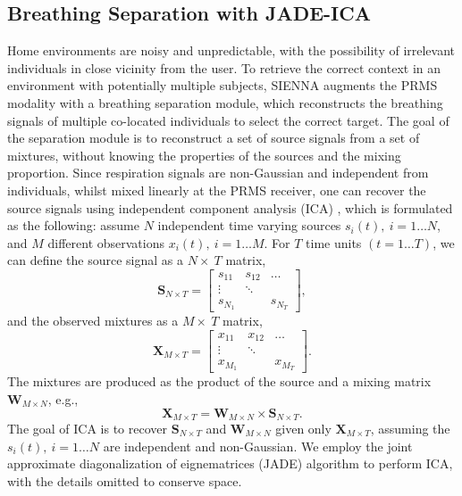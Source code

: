 \subsection{Breathing Separation with JADE-ICA}
\label{section:breathing separation}
Home environments are noisy and unpredictable, with the possibility of irrelevant individuals in close vicinity from the user. To retrieve the correct context in an environment with potentially multiple subjects, SIENNA augments the PRMS modality with a breathing separation module, which reconstructs the breathing signals of multiple co-located individuals to select the correct target. 
The goal of the separation module is to reconstruct a set of source signals from a set of mixtures, without knowing the properties of the sources and the mixing proportion. 
Since respiration signals are non-Gaussian and independent from individuals, whilst mixed linearly at the PRMS receiver, one can recover the source signals using independent component analysis (ICA) \cite{yue_extracting_2018}, which is formulated as the following: assume $N$ independent time varying sources $ s_i(t),\ i=1 \ldots N$, and $M$ different observations
$ x_i(t),\ i=1 \ldots M$. For $T$ time units $(t=1 \ldots T)$, we can define the source signal as a $N \times\ T$ matrix,
\[
\mathbf{S}_{N \times T} = \begin{bmatrix} 
    s_{11} & s_{12} & \dots \\
    \vdots & \ddots & \\
    s_{N_1} &        & s_{N_T} 
    \end{bmatrix},
\]
and the observed mixtures as a $M \times\ T$ matrix,
\[
\mathbf{X}_{M \times T} = \begin{bmatrix} 
    x_{11} & x_{12} & \dots \\
    \vdots & \ddots & \\
    x_{M_1} &        & x_{M_T}
    \end{bmatrix}.
\]
The mixtures are produced as the product of the source and a mixing matrix $\mathbf{W}_{M \times N}$, e.g.,
\[
    \mathbf{X}_{M \times T} = \mathbf{W}_{M \times N} \times \mathbf{S}_{N \times T}.
\]
The goal of ICA is to recover $\mathbf{S}_{N \times T}$ and $\mathbf{W}_{M \times N}$ given only $\mathbf{X}_{M \times T}$, assuming
the $s_i(t),\ i=1 \ldots N$ are independent and non-Gaussian. We employ the joint approximate diagonalization of eignematrices (JADE) algorithm \cite{de_lathauwer_independent_1996} to perform ICA, with the details omitted to conserve space. 

